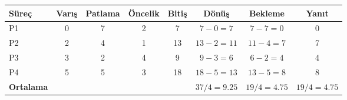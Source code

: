 \begin{tabular}{@{}lccccccc@{}}
\toprule
\textbf{Süreç} & \textbf{Varış} & \textbf{Patlama} & \textbf{Öncelik} & \textbf{Bitiş} & \textbf{Dönüş} & \textbf{Bekleme} & \textbf{Yanıt}\\
\midrule
P1 & 0 & 7 & 2 & 7 & $7-0=7$ & $7-7=0$ & 0\\
P2 & 2 & 4 & 1 & 13 & $13-2=11$ & $11-4=7$ & 7\\
P3 & 3 & 2 & 4 & 9 & $9-3=6$ & $6-2=4$ & 4\\
P4 & 5 & 5 & 3 & 18 & $18-5=13$ & $13-5=8$ & 8\\
\midrule
\textbf{Ortalama} &  &  &  &  & $37/4=9.25$ & $19/4=4.75$ & $19/4=4.75$\\
\bottomrule
\end{tabular}
